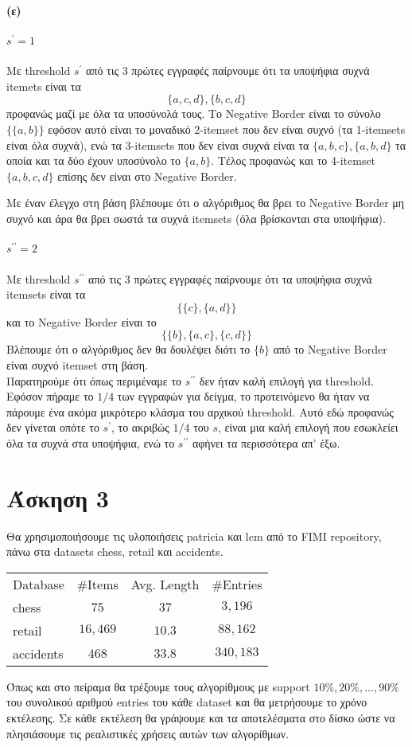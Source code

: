 \documentclass[a4paper,11pt]{article}
\begin{document}
\paragraph{(ε)}
\subparagraph{$s^\prime=1$} Με threshold $s^\prime$ από τις 3 πρώτες εγγραφές παίρνουμε ότι τα υποψήφια συχνά itemets είναι τα
\[ \{a,c,d\},\{b,c,d\} \]
προφανώς μαζί με όλα τα υποσύνολά τους.
Το Negative Border είναι το σύνολο $\{ \{a,b\} \}$ εφόσον αυτό είναι το μοναδικό 2-itemset που δεν είναι συχνό (τα 1-itemsets είναι όλα συχνά), ενώ τα 3-itemsets που δεν είναι συχνά είναι τα $\{a,b,c\},\{a,b,d\}$ τα οποία και τα δύο έχουν υποσύνολο το $\{a,b\}$.
Τέλος προφανώς και το 4-itemset $\{a,b,c,d\}$ επίσης δεν είναι στο Negative Border.

Με έναν έλεγχο στη βάση βλέπουμε ότι ο αλγόριθμος θα βρει το Negative Border μη συχνό και άρα θα βρει σωστά τα συχνά itemsets (όλα βρίσκονται στα υποψήφια).

\subparagraph{$s^{\prime\prime}=2$} Με threshold $s^{\prime\prime}$ από τις 3 πρώτες εγγραφές παίρνουμε ότι τα υποψήφια συχνά itemsets είναι τα
\[ \{ \{c\},\{a,d\} \} \]
και το Negative Border είναι το
\[ \{ \{b\},\{a,c\},\{c,d\} \} \]
Βλέπουμε ότι ο αλγόριθμος δεν θα δουλέψει διότι το $\{b\}$ από το Negative Border είναι συχνό itemset στη βάση.
\\[8pt]
Παρατηρούμε ότι όπως περιμέναμε το $s^{\prime\prime}$ δεν ήταν καλή επιλογή για threshold.
Εφόσον πήραμε το $1/4$ των εγγραφών για δείγμα, το προτεινόμενο θα ήταν να πάρουμε ένα ακόμα μικρότερο κλάσμα του αρχικού threshold.
Αυτό εδώ προφανώς δεν γίνεται οπότε το $s^\prime$, το ακριβώς $1/4$ του $s$, είναι μια καλή επιλογή που εσωκλείει όλα τα συχνά στα υποψήφια, ενώ το $s^{\prime\prime}$ αφήνει τα περισσότερα απ' έξω.

\section*{Άσκηση 3}

Θα χρησιμοποιήσουμε τις υλοποιήσεις patricia και lcm από το FIMI repository, πάνω στα datasets chess, retail και accidents.
\begin{center}
	\begin{tabular}{| l | c | c | c |}
		\hline
		Database & \#Items & Avg. Length & \#Entries \\ \hhline{|=|=|=|=|}
		chess & $75$ & $37$ & $3,196$ \\ \hline
		retail & $16,469$ & $10.3$ & $88,162$ \\ \hline
		accidents & $468$ & $33.8$ & $340,183$ \\ \hline
	\end{tabular}
\end{center}
Όπως και στο πείραμα θα τρέξουμε τους αλγορίθμους με support $10\%, 20\%, \dots,90\%$ του συνολικού αριθμού entries του κάθε dataset και θα μετρήσουμε το χρόνο εκτέλεσης.
Σε κάθε εκτέλεση θα γράψουμε και τα αποτελέσματα στο δίσκο ώστε να πλησιάσουμε τις ρεαλιστικές χρήσεις αυτών των αλγορίθμων.
\end{document}
